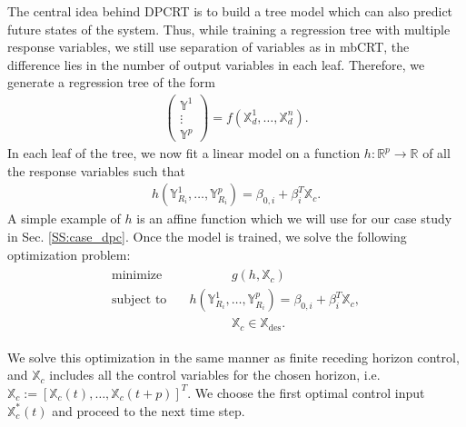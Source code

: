 The central idea behind DPCRT is to build a tree model which can also predict future states of the system. Thus, while training a regression tree with multiple response variables, we still use separation of variables as in mbCRT, the difference lies in the number of output variables in each leaf. Therefore, we generate a regression tree of the form
\begin{gather}
\begin{pmatrix}
\mathbb{Y}^1 \\ \vdots \\ \mathbb{Y}^p
\end{pmatrix}
 = \mathit{f} \left( \mathbb{X}^1_d,\dots,\mathbb{X}^n_d \right).
\label{E:train_model_multi}
\end{gather}
In each leaf of the tree, we now fit a linear model on a function $h : \mathbb{R}^p \to \mathbb{R}$ of all the response variables such that
\begin{gather}
\mathit{h} \left( \mathbb{Y}_{R_i}^1, \dots, \mathbb{Y}_{R_i}^p \right) = \beta_{0,i} + \beta^T_i \mathbb{X}_c.
\label{E:linear_leaf}
\end{gather}
A simple example of $h$ is an affine function which we will use for our case study in Sec. \ref{SS:case_dpc}. Once the model is trained, we solve the following optimization problem:
\begin{align}
\begin{aligned}
\text{minimize } \ \ \ & \ \ \ \ \ \ \ \ \ \ \ \ \ \ \ \mathit{g} \left( h, \mathbb{X}_c  \right) \\ \text{subject to } \ \ \ & \mathit{h} \left( \mathbb{Y}_{R_i}^1, \dots, \mathbb{Y}_{R_i}^p \right) = \beta_{0,i} + \beta^T_i \mathbb{X}_c, \\ \ \ \ & \ \ \ \ \ \ \ \ \ \ \ \ \ \ \ \mathbb{X}_c \in \mathbb{X}_{\mathrm{des}}.
  \end{aligned}
  \label{E:opt_multi}
\end{align}

We solve this optimization in the same manner as finite receding horizon control, and $\mathbb{X}_c$ includes all the control variables for the chosen horizon, i.e. $\mathbb{X}_c := \left[\mathbb{X}_c(t), \dots, \mathbb{X}_c(t+p)\right]^T$. We choose the first optimal control input $\mathbb{X}_c^*(t)$ and proceed to the next time step.

